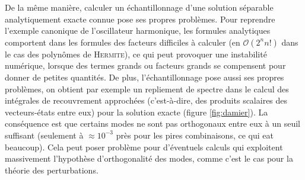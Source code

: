 \documentclass[svgnames,dvipsnames,a4paper,10pt,french]{report}
\begin{document}
De la même manière, calculer un échantillonnage d'une solution séparable analytiquement exacte  connue pose ses propres problèmes. Pour reprendre l'exemple canonique de l'oscillateur harmonique, les formules analytiques comportent dans les formules des facteurs difficiles à calculer (en $\mathcal{O}(2^nn!)$ dans le cas des polynômes de \textsc{Hermite}), ce qui peut provoquer une instabilité numérique, lorsque des termes grands ou facteurs grands se compensent pour donner de petites quantités.  De plus, l'échantillonnage pose aussi ses propres problèmes, on obtient par exemple un repliement de spectre dans le calcul des intégrales de recouvrement approchées (c'est-à-dire, des produits scalaires des vecteurs-états entre eux) pour la solution exacte (figure \ref{fig:damier}). La conséquence est que certains modes ne sont pas orthogonaux entre eux à un seuil suffisant (seulement à $\approx 10^{-3}$ près pour les pires combinaisons, ce qui eat beaucoup). Cela peut poser problème pour d'éventuels calculs qui exploitent massivement l'hypothèse d'orthogonalité des modes, comme c'est le cas pour la théorie des perturbations.
\end{document}
